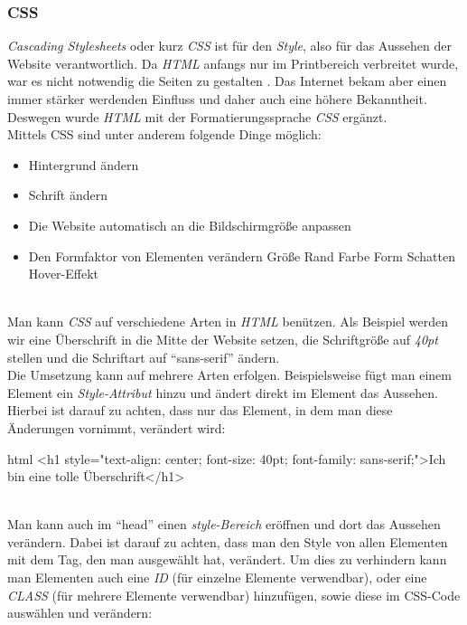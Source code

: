 		\subsubsection{CSS}
		\label{chapter:study-frontend-css}
		\textit{Cascading Stylesheets} oder kurz \textit{CSS} ist für den \textit{Style}, also für das Aussehen der Website verantwortlich. Da \textit{HTML} anfangs nur im Printbereich verbreitet wurde, war es nicht notwendig die Seiten zu gestalten \cite{html5-css3-def, html5-css3-handbuch}. Das Internet bekam aber einen immer stärker werdenden Einfluss und daher auch eine höhere Bekanntheit. Deswegen wurde \textit{HTML} mit der Formatierungssprache \textit{CSS} ergänzt.\\
		Mittels CSS sind unter anderem folgende Dinge möglich:
		\begin{itemize}
			\item Hintergrund ändern
			\item Schrift ändern
			\item Die Website automatisch an die Bildschirmgröße anpassen
			\item Den Formfaktor von Elementen verändern
			\subitem Größe
			\subitem Rand
			\subitem Farbe
			\subitem Form
			\subitem Schatten
			\subitem Hover-Effekt
		\end{itemize}
	\label{list:bspcss}~\\
		Man kann \textit{CSS} auf verschiedene Arten in \textit{HTML} benützen. Als Beispiel werden wir eine Überschrift in die Mitte der Website setzen, die Schriftgröße auf \textit{40pt} stellen und die Schriftart auf \enquote{sans-serif} ändern.\\
		Die Umsetzung kann auf mehrere Arten erfolgen. Beispielsweise fügt man einem Element ein \textit{Style-Attribut} hinzu und ändert direkt im Element das Aussehen. Hierbei ist darauf zu achten, dass nur das Element, in dem man diese Änderungen vornimmt, verändert wird:
		\begin{code}{html}
			<h1 style="text-align: center; font-size: 40pt; font-family: sans-serif;">Ich bin eine tolle Überschrift</h1>
		\end{code}
	\label{list:bspinlinecss}~\\
		Man kann auch im \enquote{head} einen \textit{style-Bereich} eröffnen und dort das Aussehen verändern. Dabei ist darauf zu achten, dass man den Style von allen Elementen mit dem Tag, den man ausgewählt hat, verändert. Um dies zu verhindern kann man Elementen auch eine \textit{ID} (für einzelne Elemente verwendbar), oder eine \textit{CLASS} (für mehrere Elemente verwendbar) hinzufügen, sowie diese im CSS-Code auswählen und verändern:
